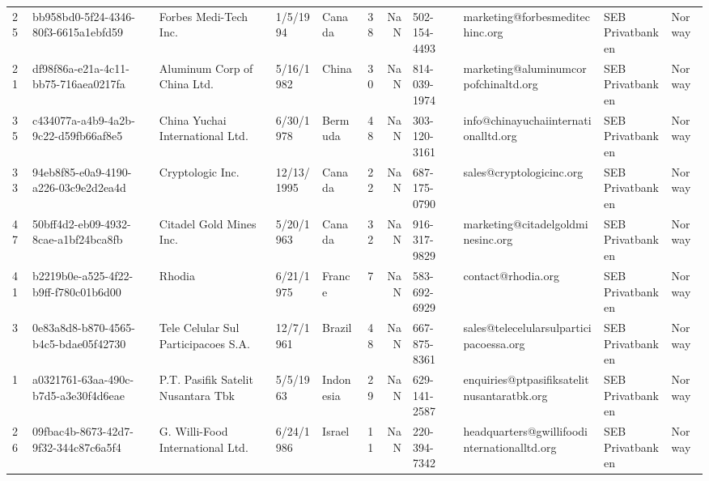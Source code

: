 \begin{tabular}{lllllrrllll}
25 &  bb958bd0-5f24-4346-80f3-6615a1ebfd59 &                     Forbes Medi-Tech Inc. &       1/5/1994 &          Canada &                  38 &      NaN &  502-154-4493 &                    marketing@forbesmeditechinc.org &  SEB Privatbanken &       Norway \\
21 &  df98f86a-e21a-4c11-bb75-716aea0217fa &               Aluminum Corp of China Ltd. &      5/16/1982 &           China &                  30 &      NaN &  814-039-1974 &               marketing@aluminumcorpofchinaltd.org &  SEB Privatbanken &       Norway \\
35 &  c434077a-a4b9-4a2b-9c22-d59fb66af8e5 &           China Yuchai International Ltd. &      6/30/1978 &         Bermuda &                  48 &      NaN &  303-120-3161 &               info@chinayuchaiinternationalltd.org &  SEB Privatbanken &       Norway \\
33 &  94eb8f85-e0a9-4190-a226-03c9e2d2ea4d &                          Cryptologic Inc. &     12/13/1995 &          Canada &                  22 &      NaN &  687-175-0790 &                           sales@cryptologicinc.org &  SEB Privatbanken &       Norway \\
47 &  50bff4d2-eb09-4932-8cae-a1bf24bca8fb &                   Citadel Gold Mines Inc. &      5/20/1963 &          Canada &                  32 &      NaN &  916-317-9829 &                  marketing@citadelgoldminesinc.org &  SEB Privatbanken &       Norway \\
41 &  b2219b0e-a525-4f22-b9ff-f780c01b6d00 &                                    Rhodia &      6/21/1975 &          France &                   7 &      NaN &  583-692-6929 &                                 contact@rhodia.org &  SEB Privatbanken &       Norway \\
3  &  0e83a8d8-b870-4565-b4c5-bdae05f42730 &       Tele Celular Sul Participacoes S.A. &      12/7/1961 &          Brazil &                  48 &      NaN &  667-875-8361 &            sales@telecelularsulparticipacoessa.org &  SEB Privatbanken &       Norway \\
1  &  a0321761-63aa-490c-b7d5-a3e30f4d6eae &        P.T. Pasifik Satelit Nusantara Tbk &       5/5/1963 &       Indonesia &                  29 &      NaN &  629-141-2587 &         enquiries@ptpasifiksatelitnusantaratbk.org &  SEB Privatbanken &       Norway \\
26 &  09fbac4b-8673-42d7-9f32-344c87c6a5f4 &          G. Willi-Food International Ltd. &      6/24/1986 &          Israel &                  11 &      NaN &  220-394-7342 &        headquarters@gwillifoodinternationalltd.org &  SEB Privatbanken &       Norway \\

\end{tabular}
